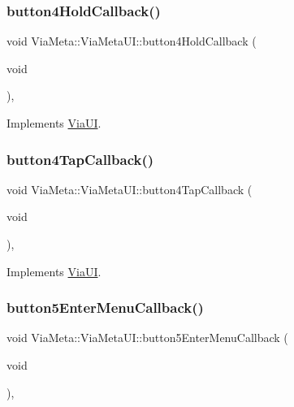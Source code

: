 \subsubsection{\texorpdfstring{button4\+Hold\+Callback()}{button4HoldCallback()}}
{\footnotesize\ttfamily void Via\+Meta\+::\+Via\+Meta\+U\+I\+::button4\+Hold\+Callback (\begin{DoxyParamCaption}\item[{void}]{ }\end{DoxyParamCaption})\hspace{0.3cm}{\ttfamily [override]}, {\ttfamily [virtual]}}



Implements \mbox{\hyperlink{class_via_u_i_a11919091b39319fe4d1b3a3f3c7104c5}{Via\+UI}}.

\mbox{\label{class_via_meta_1_1_via_meta_u_i_a0c745451e4e0b8bc51546280595b5b28}} 
\subsubsection{\texorpdfstring{button4\+Tap\+Callback()}{button4TapCallback()}}
{\footnotesize\ttfamily void Via\+Meta\+::\+Via\+Meta\+U\+I\+::button4\+Tap\+Callback (\begin{DoxyParamCaption}\item[{void}]{ }\end{DoxyParamCaption})\hspace{0.3cm}{\ttfamily [override]}, {\ttfamily [virtual]}}



Implements \mbox{\hyperlink{class_via_u_i_a4925f089aa720ca88d84246f434112e9}{Via\+UI}}.

\mbox{\label{class_via_meta_1_1_via_meta_u_i_af14bee3824185ab5a97d8745e9317370}} 
\subsubsection{\texorpdfstring{button5\+Enter\+Menu\+Callback()}{button5EnterMenuCallback()}}
{\footnotesize\ttfamily void Via\+Meta\+::\+Via\+Meta\+U\+I\+::button5\+Enter\+Menu\+Callback (\begin{DoxyParamCaption}\item[{void}]{ }\end{DoxyParamCaption})\hspace{0.3cm}{\ttfamily [override]}, {\ttfamily [virtual]}}



